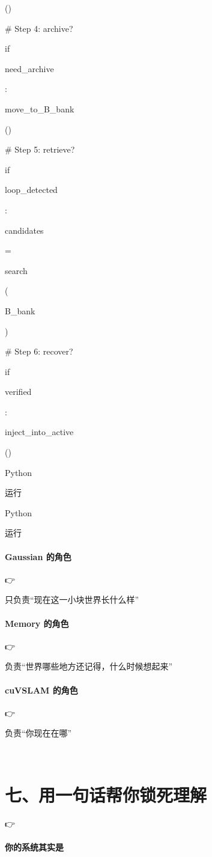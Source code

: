 \documentclass[12pt]{article}
\begin{document}
()

\# Step 4: archive?

if

need\_archive

:

move\_to\_B\_bank

()

\# Step 5: retrieve?

if

loop\_detected

:

candidates

=

search

(

B\_bank

)

\# Step 6: recover?

if

verified

:

inject\_into\_active

()

Python

运行

Python

运行

\paragraph{Gaussian 的角色}
👉

只负责“现在这一小块世界长什么样”

\paragraph{Memory 的角色}
👉

负责“世界哪些地方还记得，什么时候想起来”

\paragraph{cuVSLAM 的角色}
👉

负责“你现在在哪”

🧩

\section{七、用一句话帮你锁死理解}
👉

\paragraph{你的系统其实是}
🚨
\end{document}
